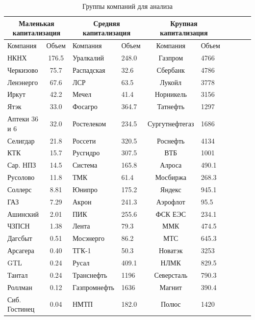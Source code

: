 \documentclass{article}
\begin{document}
\begin{table}[h]
	\centering
	\caption{Группы компаний для анализа}
	\label{tab:table6}
	\begin{tabular}{lcllcllcll}
		
		\multicolumn{2}{c}{Маленькая капитализация} & \multicolumn{2}{c}{Средняя капитализация} &  \multicolumn{2}{c}{Крупная капитализация} \\ 
		\toprule
		Компания           & Объем     &Компания           & Объем&Компания           & Объем     \\ \midrule
		НКНХ           & 176.5 & Уралкалий&  248.0 & Газпром&  4766   \\
		 Черкизово           & 75.7  & Распадская&32.6 & Сбербанк& 4786    \\ 
		  Ленэнерго           & 67.6                     &ЛСР&   63.5 & Лукойл& 3778 \\
		  Иркут & 42.2           &Мечел& 41.4 & Норникель& 3156   \\
		   Ятэк           & 33.0&Фосагро&  364.7 &Татнефть& 1297  \\
		  Аптеки 36 и 6& 32.0      &Ростелеком&  234.5 &Сургутнефтегаз& 1686  \\
		   Селигдар & 21.8                  &Россети&  320.5 &Роснефть&4134  \\
		 КТК& 15.7            &Русгидро&  307.5 &ВТБ& 1001  \\
		 Сар. НПЗ  & 14.5            &Система&  165.8 &Алроса& 490.1  \\
		  Русолово & 11.8           &ТМК& 61.4 & Мосбиржа&268.3   \\
		   Соллерс   & 8.81           &Юнипро& 175.2 & Яндекс&945.1   \\
		 ГАЗ   & 7.29           &Акрон& 241.3 &Аэрофлот&95.5   \\
		 Ашинский& 2.01            &ПИК& 255.6 &ФСК ЕЭС&234.1   \\
		   ЧЗПСН           & 1.38          &Лента& 79.3 &ММК&474.5   \\
		    Дагсбыт & 0.51         &Мосэнерго&  86.2 &МТС&645.3  \\
		  Арсагера  & 0.40           &ТГК-1&   50.3 &Новатэк&3253 \\
		  GTL& 0.24           &Русал&   409.1 &НЛМК& 829.5 \\
		     Тантал & 0.24        &Транснефть&   1196 &Северсталь&790.3 \\
		 Роллман           & 0.12            &Газпромнефть&  1636 &Магнит&390.4  \\		 		 
		   Сиб. Гостинец& 0.04          &НМТП&   182.0 &Полюс&1420 \\		 
		 \bottomrule
		
	\end{tabular}
\end{table}
\end{document}
